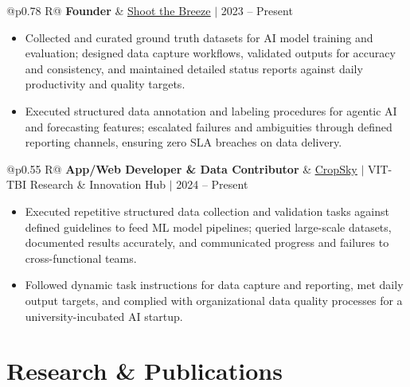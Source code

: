 \documentclass[a4paper,10pt]{article}
\newcommand{\ulink}[2]{\href{#1}{\uline{#2}}}
\newcommand{\subheading}[1]{{\color[HTML]{0A0A0A}\fontsize{12}{14}\selectfont\bfseries #1}}
\newcommand{\meta}[1]{{\color[HTML]{5C5C5C}\fontsize{10.5}{12.5}\selectfont #1}}
\begin{document}
\begin{tabularx}{\linewidth}{@{}p{0.78\linewidth} R@{}}
\subheading{Founder} & \meta{\ulink{https://shoot-the-breeze.vercel.app}{Shoot the Breeze} $|$ 2023 -- Present}
\end{tabularx}
\begin{itemize}[nosep, leftmargin=1.5em, itemsep=1pt, topsep=2pt]
\item {\color[HTML]{0A0A0A}\fontsize{11}{14}\selectfont
Collected and curated ground truth datasets for AI model training and evaluation; designed data capture workflows, validated outputs for accuracy and consistency, and maintained detailed status reports against daily productivity and quality targets.}
\item {\color[HTML]{0A0A0A}\fontsize{11}{14}\selectfont
Executed structured data annotation and labeling procedures for agentic AI and forecasting features; escalated failures and ambiguities through defined reporting channels, ensuring zero SLA breaches on data delivery.}
\end{itemize}

\vspace{2pt}

\begin{tabularx}{\linewidth}{@{}p{0.55\linewidth} R@{}}
\subheading{App/Web Developer \& Data Contributor} & \meta{\ulink{https://sites.google.com/view/cropsky/home}{CropSky} $|$ VIT-TBI Research \& Innovation Hub $|$ 2024 -- Present}
\end{tabularx}
\begin{itemize}[nosep, leftmargin=1.5em, itemsep=1pt, topsep=2pt]
\item {\color[HTML]{0A0A0A}\fontsize{11}{14}\selectfont
Executed repetitive structured data collection and validation tasks against defined guidelines to feed ML model pipelines; queried large-scale datasets, documented results accurately, and communicated progress and failures to cross-functional teams.}
\item {\color[HTML]{0A0A0A}\fontsize{11}{14}\selectfont
Followed dynamic task instructions for data capture and reporting, met daily output targets, and complied with organizational data quality processes for a university-incubated AI startup.}
\end{itemize}
\newpage
\vspace{2pt}

\section{Research \& Publications}
\vspace{2pt}
\end{document}
